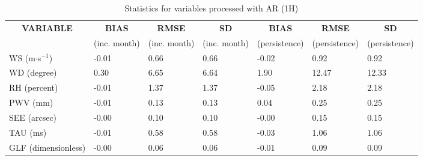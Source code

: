 \documentclass[a4paper,english]{article}
\begin{document}
\begin{table}[]
\begin{center}
\begin{tabular}{|l|l|l|l|l|l|l|}
\hline
\multicolumn{1}{|c|}{\cellcolor[HTML]{C0C0C0}\textbf{VARIABLE}} & \multicolumn{1}{c|}{\cellcolor[HTML]{C0C0C0}\textbf{BIAS}} & \multicolumn{1}{c|}{\cellcolor[HTML]{C0C0C0}\textbf{RMSE}} & \multicolumn{1}{c|}{\cellcolor[HTML]{C0C0C0}\textbf{SD}} & \multicolumn{1}{c|}{\cellcolor[HTML]{C0C0C0}\textbf{BIAS}} & \multicolumn{1}{c|}{\cellcolor[HTML]{C0C0C0}\textbf{RMSE}} & \multicolumn{1}{c|}{\cellcolor[HTML]{C0C0C0}\textbf{SD}}\\
\multicolumn{1}{|c|}{\cellcolor[HTML]{C0C0C0}} & \multicolumn{1}{c|}{\cellcolor[HTML]{C0C0C0}(inc. month)} & \multicolumn{1}{c|}{\cellcolor[HTML]{C0C0C0}(inc. month)} & \multicolumn{1}{c|}{\cellcolor[HTML]{C0C0C0}(inc. month)} & \multicolumn{1}{c|}{\cellcolor[HTML]{C0C0C0}(persistence)} & \multicolumn{1}{c|}{\cellcolor[HTML]{C0C0C0}(persistence)} & \multicolumn{1}{c|}{\cellcolor[HTML]{C0C0C0}(persistence)}\\\hline
\cellcolor[HTML]{C0C0C0}WS (m$\cdot$s$^{-1}$) &     -0.01  &      0.66  &      0.66  &     -0.02  &      0.92  &      0.92\\
\cellcolor[HTML]{C0C0C0}WD (degree)           &      0.30  &      6.65  &      6.64  &      1.90  &     12.47  &     12.33\\
\cellcolor[HTML]{C0C0C0}RH (percent)          &     -0.01  &      1.37  &      1.37  &     -0.05  &      2.18  &      2.18\\
\cellcolor[HTML]{C0C0C0}PWV (mm)              &     -0.01 &      0.13 &      0.13 &      0.04 &      0.25 &      0.25\\
\cellcolor[HTML]{C0C0C0}SEE (arcsec)          &     -0.00 &      0.10 &      0.10 &     -0.00 &      0.15 &      0.15\\
\cellcolor[HTML]{C0C0C0}TAU (ms)              &     -0.01 &      0.58 &      0.58 &     -0.03 &      1.06 &      1.06\\
\cellcolor[HTML]{C0C0C0}GLF (dimensionless)   &     -0.00 &      0.06 &      0.06 &     -0.01 &      0.09 &      0.09\\
\hline
\end{tabular}
\caption{Statistics for variables processed with AR (1H)}
\end{center}
\end{table}


\newpage
\end{document}
